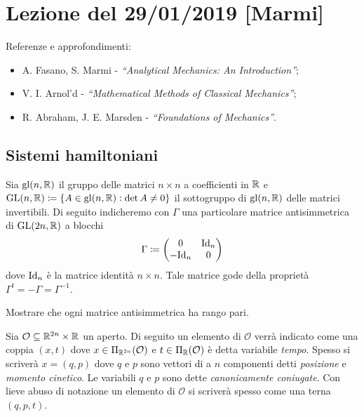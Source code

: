 \section{Lezione del 29/01/2019 [Marmi]}
Referenze e approfondimenti:
\begin{itemize}
    \item A. Fasano, S. Marmi - \emph{``Analytical Mechanics: An Introduction''};
    \item V. I. Arnol'd - \emph{``Mathematical Methods of Classical Mechanics''};
    \item R. Abraham, J. E. Marsden - \emph{``Foundations of Mechanics''}.
\end{itemize}

\subsection{Sistemi hamiltoniani}
Sia $ \mathrm{gl}(n, \mathbb{R}) $ il gruppo delle matrici $ n \times n $ a coefficienti in $ \mathbb{R} $ e $ {\mathrm{GL}(n, \mathbb{R}) \coloneqq \{A \in \mathrm{gl}(n, \mathbb{R}) : \det{A} \neq 0\}} $ il sottogruppo di $ \mathrm{gl}(n, \mathbb{R}) $ delle matrici invertibili. Di seguito indicheremo con $ \Gamma $ una particolare matrice antisimmetrica di $ \mathrm{GL}(2n, \mathbb{R}) $ a blocchi
\begin{equation}
    \Gamma \coloneqq
    \begin{pmatrix}
        0 & \mathrm{Id}_{n} \\
        -\mathrm{Id}_{n} & 0 \\
    \end{pmatrix}
\end{equation}
dove $ \mathrm{Id}_n $ è la matrice identità $ n \times n $. Tale matrice gode della proprietà $ \Gamma^t = -\Gamma = \Gamma^{-1} $. \\

\begin{exercise}
    Mostrare che ogni matrice antisimmetrica ha rango pari.
\end{exercise}

Sia $ \mathcal{O} \subseteq \mathbb{R}^{2n} \times \mathbb{R} $ un aperto. Di seguito un elemento di $ \mathcal{O} $ verrà indicato come una coppia $ (x, t) $ dove $ x \in \Pi_{\mathbb{R}^{2n}}(\mathcal{O}) $ e $ t \in \Pi_{\mathbb{R}}(\mathcal{O}) $ è detta variabile \emph{tempo}. Spesso si scriverà $ x = (q, p) $ dove $ q $ e $ p $ sono vettori di a $ n $ componenti detti \emph{posizione} e \emph{momento cinetico}. Le variabili $ q $ e $ p $ sono dette \emph{canonicamente coniugate}. Con lieve abuso di notazione un elemento di $ \mathcal{O} $ si scriverà spesso come una terna $ (q, p, t) $. \\

